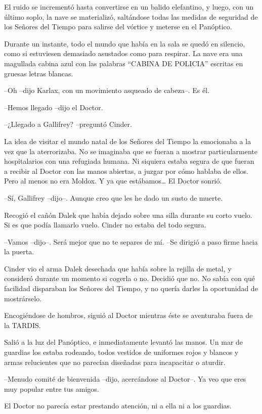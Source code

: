 El ruido se incrementó hasta convertirse en un balido elefantino, y luego, con un último soplo, la nave se materializó, saltándose todas las medidas de seguridad de los Señores del Tiempo para salirse del vórtice y meterse en el Panóptico.

Durante un instante, todo el mundo que había en la sala se quedó en silencio, como si estuviesen demasiado asustados como para respirar. La nave era una magullada cabina azul con las palabras ``CABINA DE POLICIA'' escritas en gruesas letras blancas.

--Oh --dijo Karlax, con un movimiento asqueado de cabeza--. Es él. 

\mbox{}

--Hemos llegado --dijo el Doctor.

--¿Llegado a Gallifrey? --preguntó Cinder.

La idea de visitar el mundo natal de los Señores del Tiempo la emocionaba a la vez que la aterrorizaba. No se imaginaba que se fueran a mostrar particularmente hospitalarios con una refugiada humana. Ni siquiera estaba segura de que fueran a recibir al Doctor con las manos abiertas, a juzgar por cómo hablaba de ellos. Pero al menos no era Moldox. Y ya que estábamos… El Doctor sonrió.

--Sí, Gallifrey --dijo--. Aunque creo que les he dado un susto de muerte. 

Recogió el cañón Dalek que había dejado sobre una silla durante su corto vuelo. Si es que podía llamarlo vuelo. Cinder no estaba del todo segura.

--Vamos --dijo--. Será mejor que no te separes de mí. --Se dirigió a paso firme hacia la puerta.

Cinder vio el arma Dalek desechada que había sobre la rejilla de metal, y consideró durante un momento si cogerla o no. Decidió que no. No sabía con qué facilidad disparaban los Señores del Tiempo, y no quería darles la oportunidad de mostrárselo.

Encogiéndose de hombros, siguió al Doctor mientras éste se aventuraba fuera de la TARDIS.

Salió a la luz del Panóptico, e inmediatamente levantó las manos. Un mar de guardias los estaba rodeando, todos vestidos de uniformes rojos y blancos y armas relucientes que no parecían diseñadas para incapacitar o aturdir.

--Menudo comité de bienvenida --dijo, acercándose al Doctor--. Ya veo que eres muy popular entre tus amigos.

El Doctor no parecía estar prestando atención, ni a ella ni a los guardias.

